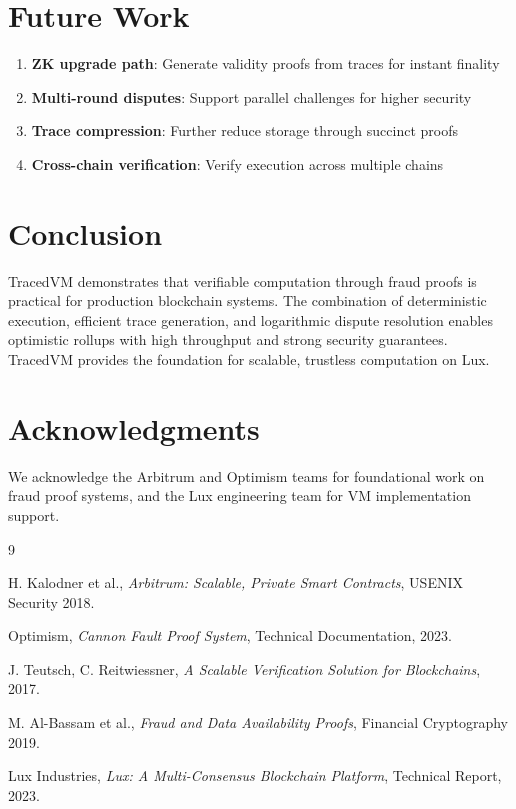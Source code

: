 \documentclass[11pt,a4paper]{article}
\begin{document}
\section{Future Work}

\begin{enumerate}
    \item \textbf{ZK upgrade path}: Generate validity proofs from traces for instant finality
    \item \textbf{Multi-round disputes}: Support parallel challenges for higher security
    \item \textbf{Trace compression}: Further reduce storage through succinct proofs
    \item \textbf{Cross-chain verification}: Verify execution across multiple chains
\end{enumerate}

\section{Conclusion}

TracedVM demonstrates that verifiable computation through fraud proofs is practical for production blockchain systems. The combination of deterministic execution, efficient trace generation, and logarithmic dispute resolution enables optimistic rollups with high throughput and strong security guarantees. TracedVM provides the foundation for scalable, trustless computation on Lux.

\section*{Acknowledgments}

We acknowledge the Arbitrum and Optimism teams for foundational work on fraud proof systems, and the Lux engineering team for VM implementation support.


\begin{thebibliography}{9}

 H. Kalodner et al., \textit{Arbitrum: Scalable, Private Smart Contracts}, USENIX Security 2018.

 Optimism, \textit{Cannon Fault Proof System}, Technical Documentation, 2023.

 J. Teutsch, C. Reitwiessner, \textit{A Scalable Verification Solution for Blockchains}, 2017.

 M. Al-Bassam et al., \textit{Fraud and Data Availability Proofs}, Financial Cryptography 2019.

 Lux Industries, \textit{Lux: A Multi-Consensus Blockchain Platform}, Technical Report, 2023.

\end{thebibliography}
\end{document}
